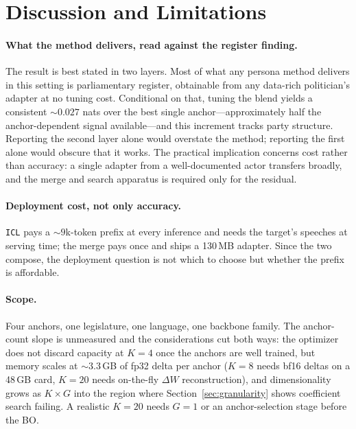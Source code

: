 \documentclass[11pt,letterpaper]{article}
\begin{document}
\section{Discussion and Limitations}
\label{sec:discussion}
\paragraph{What the method delivers, read against the register finding.} The result is best stated in two layers. Most of what any persona method delivers in this setting is parliamentary register, obtainable from any data-rich politician's adapter at no tuning cost. Conditional on that, tuning the blend yields a consistent ${\sim}0.027$ nats over the best single anchor---approximately half the anchor-dependent signal available---and this increment tracks party structure. Reporting the second layer alone would overstate the method; reporting the first alone would obscure that it works. The practical implication concerns cost rather than accuracy: a single adapter from a well-documented actor transfers broadly, and the merge and search apparatus is required only for the residual.

\paragraph{Deployment cost, not only accuracy.} \texttt{ICL} pays a ${\sim}9$k-token prefix at every inference and needs the target's speeches at serving time; the merge pays once and ships a 130\,MB adapter. Since the two compose, the deployment question is not which to choose but whether the prefix is affordable.

\paragraph{Scope.} Four anchors, one legislature, one language, one backbone family. The anchor-count slope is unmeasured and the considerations cut both ways: the optimizer does not discard capacity at $K=4$ once the anchors are well trained, but memory scales at ${\sim}3.3$\,GB of fp32 delta per anchor ($K=8$ needs bf16 deltas on a 48\,GB card, $K=20$ needs on-the-fly $\Delta W$ reconstruction), and dimensionality grows as $K\times G$ into the region where Section~\ref{sec:granularity} shows coefficient search failing. A realistic $K=20$ needs $G=1$ or an anchor-selection stage before the BO.
\end{document}
